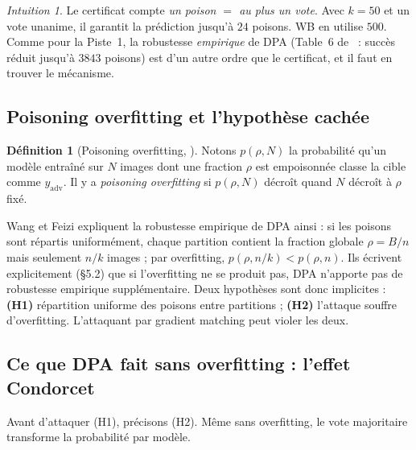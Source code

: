 \documentclass[11pt,a4paper]{article}
\theoremstyle{plain}
\theoremstyle{definition}
\newtheorem{definition}[theorem]{Définition}
\theoremstyle{remark}
\newtheorem{intuition}[theorem]{Intuition}
\newcommand{\yadv}{y_{\mathrm{adv}}}
\begin{document}
\begin{intuition}
Le certificat compte \emph{un poison $=$ au plus un vote}. Avec $k=50$ et un vote unanime, il
garantit la prédiction jusqu'à $24$ poisons. WB en utilise $500$. Comme pour la Piste~1, la
robustesse \emph{empirique} de DPA (Table~6 de~\cite{wang2023} : succès réduit jusqu'à
$3843$ poisons) est d'un autre ordre que le certificat, et il faut en trouver le mécanisme.
\end{intuition}

\subsection{Poisoning overfitting et l'hypothèse cachée}

\begin{definition}[Poisoning overfitting, {\cite[Déf.~5.1]{wang2023}}]
Notons $p(\rho,N)$ la probabilité qu'un modèle entraîné sur $N$ images dont une fraction $\rho$
est empoisonnée classe la cible comme $\yadv$. Il y a \emph{poisoning overfitting} si
$p(\rho,N)$ décroît quand $N$ décroît à $\rho$ fixé.
\end{definition}

Wang et Feizi expliquent la robustesse empirique de DPA ainsi : si les poisons sont répartis
uniformément, chaque partition contient la fraction globale $\rho=B/n$ mais seulement $n/k$
images ; par overfitting, $p(\rho,n/k)<p(\rho,n)$. Ils écrivent explicitement
(\S5.2) que si l'overfitting ne se produit pas, DPA n'apporte pas de robustesse empirique
supplémentaire. Deux hypothèses sont donc implicites : \textbf{(H1)} répartition uniforme des
poisons entre partitions ; \textbf{(H2)} l'attaque souffre d'overfitting. L'attaquant par gradient
matching peut violer les deux.

\subsection{Ce que DPA fait sans overfitting : l'effet Condorcet}

Avant d'attaquer (H1), précisons (H2). Même sans overfitting, le vote majoritaire transforme la
probabilité par modèle.
\end{document}
